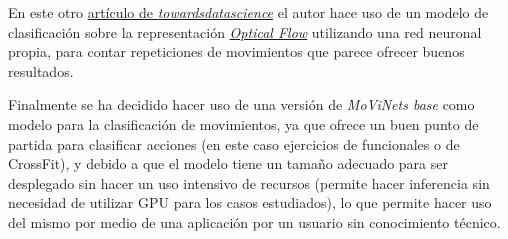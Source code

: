 En este otro \href{https://towardsdatascience.com/how-i-created-the-workout-movement-counting-app-using-deep-learning-and-optical-flow-89f9d2e087ac}{artículo de \textit{towardsdatascience}} el autor hace uso de un modelo de clasificación sobre la representación \href{https://docs.opencv.org/3.4/d4/dee/tutorial_optical_flow.html}{\textit{Optical Flow}} utilizando una red neuronal propia, para contar repeticiones de movimientos que parece ofrecer buenos resultados.

Finalmente se ha decidido hacer uso de una versión de \textit{MoViNets base} como modelo para la clasificación de movimientos, ya que ofrece un buen punto de partida para clasificar acciones (en este caso ejercicios de funcionales o de CrossFit), y debido a que el modelo tiene un tamaño adecuado para ser desplegado sin hacer un uso intensivo de recursos (permite hacer inferencia sin necesidad de utilizar GPU para los casos estudiados), lo que permite hacer uso del mismo por medio de una aplicación por un usuario sin conocimiento técnico.

